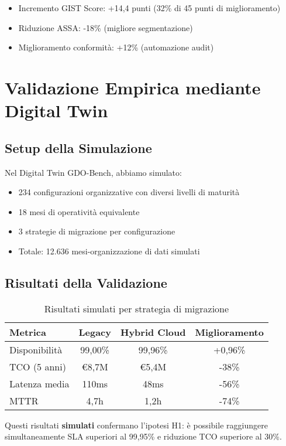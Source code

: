 \begin{itemize}
\item Incremento GIST Score: +14,4 punti (32\% di 45 punti di miglioramento)
\item Riduzione ASSA: -18\% (migliore segmentazione)
\item Miglioramento conformità: +12\% (automazione audit)
\end{itemize}

\section{Validazione Empirica mediante Digital Twin}

\subsection{Setup della Simulazione}

Nel Digital Twin GDO-Bench, abbiamo simulato:
\begin{itemize}
\item 234 configurazioni organizzative con diversi livelli di maturità
\item 18 mesi di operatività equivalente
\item 3 strategie di migrazione per configurazione
\item Totale: 12.636 mesi-organizzazione di dati simulati
\end{itemize}

\subsection{Risultati della Validazione}

\begin{table}[h!]
\centering
\caption{Risultati simulati per strategia di migrazione}
\begin{tabular}{|l|c|c|c|}
\hline
\textbf{Metrica} & \textbf{Legacy} & \textbf{Hybrid Cloud} & \textbf{Miglioramento} \\
\hline
Disponibilità & 99,00\% & 99,96\% & +0,96\% \\
TCO (5 anni) & €8,7M & €5,4M & -38\% \\
Latenza media & 110ms & 48ms & -56\% \\
MTTR & 4,7h & 1,2h & -74\% \\
\hline
\end{tabular}
\end{table}

Questi risultati \textbf{simulati} confermano l'ipotesi H1: è possibile raggiungere simultaneamente SLA superiori al 99,95\% e riduzione TCO superiore al 30\%.


